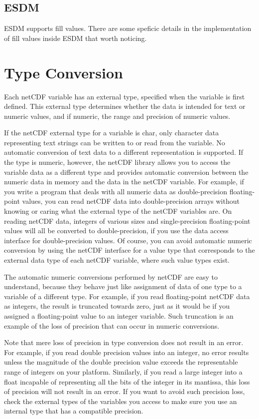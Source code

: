 \subsection{ESDM}

\tab
ESDM supports fill values. There are some speficic details in the implementation of fill values inside ESDM that worth noticing.

\tocheck

\section{Type Conversion}

\tab
Each netCDF variable has an external type, specified when the variable is first defined. This external type determines whether the data is intended for text or numeric values, and if numeric, the range and precision of numeric values.

If the netCDF external type for a variable is char, only character data representing text strings can be written to or read from the variable. No automatic conversion of text data to a different representation is supported. If the type is numeric, however, the netCDF library allows you to access the variable data as a different type and provides automatic conversion between the numeric data in memory and the data in the netCDF variable. For example, if you write a program that deals with all numeric data as double-precision floating-point values, you can read netCDF data into double-precision arrays without knowing or caring what the external type of the netCDF variables are. On reading netCDF data, integers of various sizes and single-precision floating-point values will all be converted to double-precision, if you use the data access interface for double-precision values. Of course, you can avoid automatic numeric conversion by using the netCDF interface for a value type that corresponds to the external data type of each netCDF variable, where such value types exist.

The automatic numeric conversions performed by netCDF are easy to understand, because they behave just like assignment of data of one type to a variable of a different type. For example, if you read floating-point netCDF data as integers, the result is truncated towards zero, just as it would be if you assigned a floating-point value to an integer variable. Such truncation is an example of the loss of precision that can occur in numeric conversions.

Note that mere loss of precision in type conversion does not result in an error. For example, if you read double precision values into an integer, no error results unless the magnitude of the double precision value exceeds the representable range of integers on your platform. Similarly, if you read a large integer into a float incapable of representing all the bits of the integer in its mantissa, this loss of precision will not result in an error. If you want to avoid such precision loss, check the external types of the variables you access to make sure you use an internal type that has a compatible precision.

